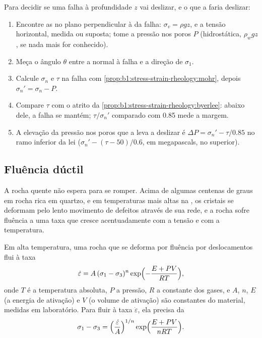 \begin{method}\label{met:b1:stress-strain-rheology:slip-test}
Para decidir se uma falha à profundidade $z$ vai deslizar, e o que a faria deslizar:
\begin{enumerate}
  \item Encontre as  no plano perpendicular à  da falha: $\sigma_v = \rho g z$, e a tensão horizontal, medida ou suposta; tome a pressão nos poros $P$ (hidrostática, $\rho_w g z$, se nada mais for conhecido).
  \item Meça o ângulo $\theta$ entre a normal à falha e a direção de $\sigma_1$.
  \item Calcule $\sigma_n$ e $\tau$ na falha com
        \cref{prop:b1:stress-strain-rheology:mohr}, depois
        $\sigma_n' = \sigma_n - P$.
  \item Compare $\tau$ com o atrito da
        \cref{prop:b1:stress-strain-rheology:byerlee}: abaixo dele, a falha se mantém; $\tau/\sigma_n'$ comparado com 0.85 mede a margem.
  \item A elevação da pressão nos poros que a leva a deslizar é
        $\Delta P = \sigma_n' - \tau/0.85$ no ramo inferior da lei ($\sigma_n' - (\tau - 50)/0.6$, em megapascals, no superior).
\end{enumerate}
\end{method}

\subsection*{Fluência dúctil}

A rocha quente não espera para se romper. Acima de algumas centenas de graus em rocha rica em quartzo, e em temperaturas mais altas na , os cristais se deformam pelo lento movimento de defeitos através de sua rede, e a rocha sofre fluência a uma taxa que cresce acentuadamente com a tensão e com a temperatura.

\begin{proposition}\label{prop:b1:stress-strain-rheology:creep}
Em alta temperatura, uma rocha que se deforma por fluência por deslocamentos flui à taxa
\[
  \dot\varepsilon = A\,(\sigma_1 - \sigma_3)^n \exp\Bigl(-\frac{E + PV}{RT}\Bigr),
\]
onde $T$ é a temperatura absoluta, $P$ a pressão, $R$ a constante dos gases, e $A$, $n$, $E$ (a energia de ativação) e $V$ (o volume de ativação) são constantes do material, medidas em laboratório. Para fluir à taxa $\dot\varepsilon$, ela precisa da 
\[
  \sigma_1 - \sigma_3 = \Bigl(\frac{\dot\varepsilon}{A}\Bigr)^{1/n}
  \exp\Bigl(\frac{E + PV}{nRT}\Bigr).
\]
\end{proposition}
\admitted

